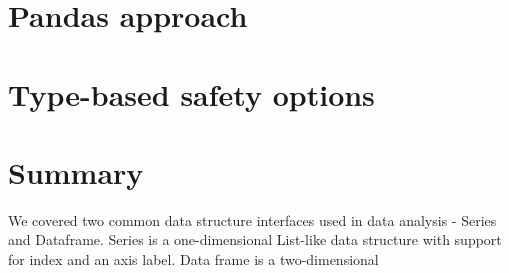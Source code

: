 \section{Pandas approach} %


\section{Type-based safety options} %


\section*{Summary} %

We covered two common data structure interfaces used in data analysis - Series and Dataframe.
Series is a one-dimensional List-like data structure with support for index and an axis label.
Data frame is a two-dimensional